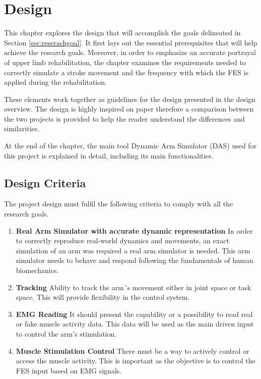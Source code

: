 \chapter{Design} \label{Design}

This chapter explores the design that will accomplish the goals delineated in Section \ref{sec:reserachgoal}. It first lays out the essential prerequisites that will help achieve the research goals. Moreover, in order to emphasize an accurate portrayal of upper limb rehabilitation, the chapter examines the requirements needed to correctly simulate a stroke movement and the frequency with which the FES is applied during the rehabilitation. 

These elements work together as guidelines for the design presented in the design overview. The design is highly inspired on paper \cite{QSC} therefore a comparison between the two projects is provided to help the reader understand the differences and similarities.

At the end of the chapter, the main tool Dynamic Arm Simulator (DAS) used for this project is explained in detail, including its main functionalities.


\section{Design Criteria} 

The project design must fulfil the following criteria to comply with all the research goals.

\begin{enumerate}
    \item \textbf{Real Arm Simulator with accurate dynamic representation} In order to correctly reproduce real-world dynamics and movements, an exact simulation of an arm was required a real arm simulator is needed. This arm simulator needs to behave and respond following the fundamentals of human biomechanics.
    \item \textbf{Tracking} Ability to track the arm´s movement either in joint space or task space. This will provide flexibility in the control system. 
    \item \textbf{EMG Reading} It should present the capability or a possibility to read real or fake muscle activity data. This data will be used as the main driven input to control the arm's stimulation.
    \item \textbf{Muscle Stimulation Control} There must be a way to actively control or access the muscle activity. This is important as the objective is to control the FES input based on EMG signals. 
    
\end{enumerate}

